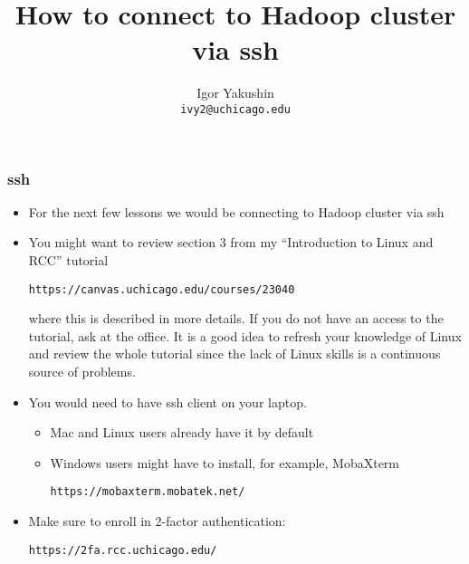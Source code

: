 \documentclass{beamer}
\title{\huge{How to connect to Hadoop cluster via ssh}}
\author{Igor Yakushin \\ \texttt{ivy2@uchicago.edu}}
\begin{document}



\begin{frame}
  \titlepage
\end{frame}


\begin{frame}[fragile]
  \frametitle{ssh}
  \begin{itemize}
  \item For the next few lessons we would be connecting to Hadoop cluster via {\color{mycolorcli} ssh}
  \item You might want to review section 3 from my ``Introduction to Linux and RCC'' tutorial
    {\color{mycolorcli}
\begin{verbatim}
https://canvas.uchicago.edu/courses/23040
\end{verbatim}
    }
    where this is described in more details.
    If you do not have an access to the tutorial, ask at the office. It is a good idea to refresh your knowledge of Linux and review the whole tutorial since the lack of Linux skills is a continuous source of problems.
  \item You would need to have ssh client on your laptop.
    \begin{itemize}
    \item Mac and Linux users already have it by default
    \item Windows users might have to install, for example, MobaXterm
    {\color{mycolorcli}
\begin{verbatim}
https://mobaxterm.mobatek.net/
\end{verbatim}
    }
    \end{itemize}
    
  \item Make sure to enroll in 2-factor authentication:
    {\color{mycolorcli}
\begin{verbatim}
https://2fa.rcc.uchicago.edu/
\end{verbatim}
    }
  \end{itemize}
\end{frame}
\end{document}
